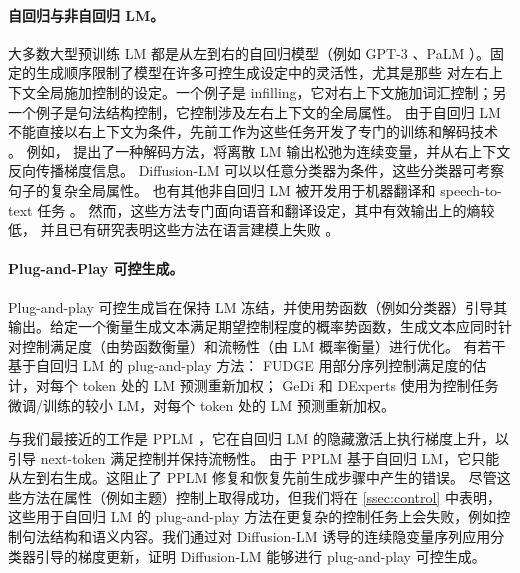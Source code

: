 \documentclass{article}
\begin{document}
\paragraph{自回归与非自回归 LM。}
大多数大型预训练 LM 都是从左到右的自回归模型（例如 GPT-3 \cite{brown-et-al-gpt3}、PaLM \cite{Chowdhery2022PaLMSL}）。固定的生成顺序限制了模型在许多可控生成设定中的灵活性，尤其是那些
对左右上下文全局施加控制的设定。一个例子是 infilling，它对右上下文施加词汇控制；另一个例子是句法结构控制，它控制涉及左右上下文的全局属性。
由于自回归 LM 不能直接以右上下文为条件，先前工作为这些任务开发了专门的训练和解码技术 \cite{sha-2020-gradient,donahue-etal-2020-enabling,qin-etal-2020-back}。
例如，\citet{Qin-COLD} 提出了一种解码方法，将离散 LM 输出松弛为连续变量，并从右上下文反向传播梯度信息。
Diffusion-LM 可以以任意分类器为条件，这些分类器可考察句子的复杂全局属性。
也有其他非自回归 LM 被开发用于机器翻译和 speech-to-text 任务 \cite{gu2018nonautoregressive,saharia2020latentalignments}。
然而，这些方法专门面向语音和翻译设定，其中有效输出上的熵较低，
并且已有研究表明这些方法在语言建模上失败 \cite{ren-etal-2020-study}。

\paragraph{Plug-and-Play 可控生成。}
Plug-and-play 可控生成旨在保持 LM 冻结，并使用势函数（例如分类器）引导其输出。给定一个衡量生成文本满足期望控制程度的概率势函数，生成文本应同时针对控制满足度（由势函数衡量）和流畅性（由 LM 概率衡量）进行优化。
有若干基于自回归 LM 的 plug-and-play 方法：
FUDGE \cite{yang-klein-2021-fudge} 用部分序列控制满足度的估计，对每个 token 处的 LM 预测重新加权；
GeDi \cite{KrauseGeDi2020} 和 DExperts \cite{liu-etal-2021-dexperts} 使用为控制任务微调/训练的较小 LM，对每个 token 处的 LM 预测重新加权。


与我们最接近的工作是 PPLM \cite{Dathathri2020Plug}，它在自回归 LM 的隐藏激活上执行梯度上升，以引导 next-token 满足控制并保持流畅性。
由于 PPLM 基于自回归 LM，它只能从左到右生成。这阻止了 PPLM 修复和恢复先前生成步骤中产生的错误。
尽管这些方法在属性（例如主题）控制上取得成功，但我们将在 \cref{ssec:control} 中表明，这些用于自回归 LM 的 plug-and-play 方法在更复杂的控制任务上会失败，例如控制句法结构和语义内容。我们通过对 Diffusion-LM 诱导的连续隐变量序列应用分类器引导的梯度更新，证明 Diffusion-LM 能够进行 plug-and-play 可控生成。





\newcommand{\Length}{Length\xspace}
\newcommand{\Spans}{Syntax Spans\xspace} 
\newcommand{\POS}{Parts-of-speech\xspace}
\newcommand{\Syntax}{Syntax Tree\xspace} 
\newcommand{\Content}{Semantic Content\xspace} 
\end{document}
